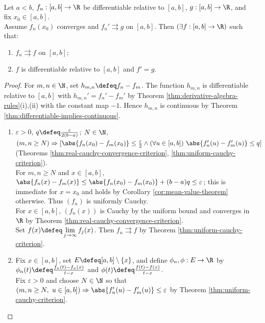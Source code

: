 \begin{theorem} \label{thm:uniform-derivative-convergence} \\
Let $a<b$, $f_n:[a,b]\to\R$ be differentiable relative to $[a,b]$, $g:[a,b]\to\R$, and fix $x_0\in[a,b]$.\\
Assume $f_n(x_0)$ converges and $f_n'\rightrightarrows g$ on $[a,b]$. Then $(\exists f:[a,b]\to\R)$ such that:
\begin{enumerate}[label=(\roman*)]
\setlength{\itemsep}{0pt}
\item $f_n\rightrightarrows f$ on $[a,b]$;
\item $f$ is differentiable relative to $[a,b]$ and $f'=g$.
\end{enumerate}
\begin{proof}
For $m,n\in\N$, set $h_{m,n}\defeq f_n-f_m$. The function $h_{m,n}$ is differentiable relative to $[a,b]$ with $h_{m,n}'=f_n'-f_m'$ by Theorem \ref{thm:derivative-algebra-rules}(i),(ii) with the constant map $-1$. Hence $h_{m,n}$ is continuous by Theorem \ref{thm:differentiable-implies-continuous}.
\begin{enumerate}[label=(\roman*)]
\setlength{\itemsep}{0pt}
\item $\varepsilon>0$, $q\defeq\frac{\varepsilon}{2(b-a)}$; $N\in\N$, $(m,n\geq N)\Rightarrow[\abs{f_n(x_0)-f_m(x_0)}\leq\frac{\varepsilon}{2}\land(\forall u\in[a,b])\ \abs{f_n'(u)-f_m'(u)}\leq q]$ (Theorems \ref{thm:real-cauchy-convergence-criterion}, \ref{thm:uniform-cauchy-criterion}).\\
For $m,n\geq N$ and $x\in[a,b]$, $\abs{f_n(x)-f_m(x)}\leq\abs{f_n(x_0)-f_m(x_0)}+(b-a)q\leq\varepsilon$; this is immediate for $x=x_0$ and holds by Corollary \ref{cor:mean-value-theorem} otherwise. Thus $(f_n)$ is uniformly Cauchy.\\
For $x\in[a,b]$, $(f_n(x))$ is Cauchy by the uniform bound and converges in $\R$ by Theorem \ref{thm:real-cauchy-convergence-criterion}.\\
Set $f(x)\defeq\lim\limits_{j\to\infty}f_j(x)$. Then $f_n\rightrightarrows f$ by Theorem \ref{thm:uniform-cauchy-criterion}.
\item Fix $x\in[a,b]$, set $E\defeq[a,b]\setminus\{x\}$, and define $\phi_n,\phi:E\to\R$ by $\phi_n(t)\defeq\frac{f_n(t)-f_n(x)}{t-x}$ and $\phi(t)\defeq\frac{f(t)-f(x)}{t-x}$.\\
Fix $\varepsilon>0$ and choose $N\in\N$ so that $(m,n\geq N,\ u\in[a,b])\Rightarrow\abs{f_n'(u)-f_m'(u)}\leq\varepsilon$ by Theorem \ref{thm:uniform-cauchy-criterion}.\\

\end{enumerate}
\end{proof}
\end{theorem}

